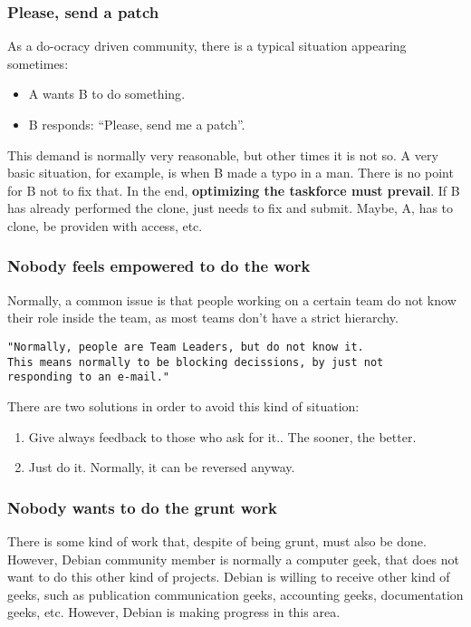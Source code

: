 \documentclass[11pt]{article}
\begin{document}
\subsubsection{Please, send a patch}
As a do-ocracy driven community, there is a typical situation appearing sometimes:
\begin{itemize}
\item{A wants B to do something}.
\item{B responds: ``Please, send me a patch''}.
\end{itemize}
This demand is normally very reasonable, but other times it is not so. A very basic situation, for example, is when B made a typo in a man. There is no point for B not to fix that. In the end, \textbf{optimizing the taskforce must prevail}. If B has already performed the clone, just needs to fix and submit. Maybe, A, has to clone, be providen with access, etc. 

\subsubsection{Nobody feels empowered to do the work}
Normally, a common issue is that people working on a certain team do not know their role inside the team, as most teams don't have a strict hierarchy.
\begin{verbatim}
"Normally, people are Team Leaders, but do not know it.
This means normally to be blocking decissions, by just not 
responding to an e-mail."
\end{verbatim}
There are two solutions in order to avoid this kind of situation:
\begin{enumerate}
\item{Give always feedback to those who ask for it.}. The sooner, the better.
\item{Just do it.} Normally, it can be reversed anyway.
\end{enumerate}

\subsubsection{Nobody wants to do the grunt work}
There is some kind of work that, despite of being grunt, must also be done. However, Debian community member is normally a computer geek, that does not want to do this other kind of projects. Debian is willing to receive other kind of geeks, such as publication communication geeks, accounting geeks, documentation geeks, etc. However, Debian is making progress in this area. 
\end{document}
